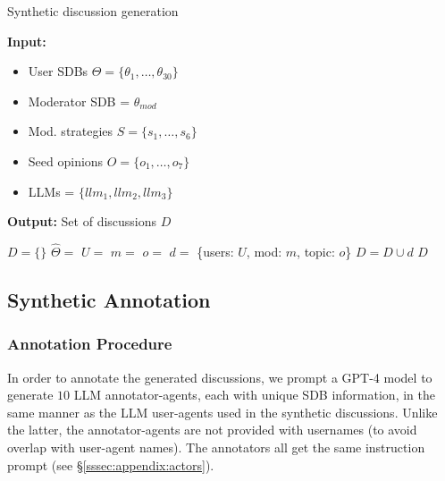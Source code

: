 \begin{algorithm}[t]
\caption{Synthetic discussion generation}
\label{alg:exp_generation}
\hspace*{\algorithmicindent} \textbf{Input:} 
         \begin{itemize}[noitemsep, nosep]
             \item User \acsp{SDB} $\Theta = \{\theta_1, \dots, \theta_{30}\}$
             \item Moderator \acs{SDB} = $\theta_{mod}$
             \item Mod. strategies $S = \{s_1, \ldots, s_6\}$
             \item Seed opinions $O = \{o_1, \ldots, o_7\}$
             \item \acp{LLM} = $\{llm_1, llm_2, llm_3\}$
         \end{itemize}
         \hspace*{\algorithmicindent} \textbf{Output:} Set of discussions $D$
\begin{algorithmic}[1]
    \State $D = \{\}$
                \State $\hat{\Theta} = $ 
                \State $U =$  
                \State $m = $ 
                \State $o = $ 
                \State $d =$ \{users: $U$, mod: $m$, topic: $o$\}
                \State $D = D \cup d$
            \EndFor
        \EndFor
    \EndFor
    \State \Return $D$
\end{algorithmic}
\end{algorithm}


\subsection{Synthetic Annotation}
\label{ssec:appendix:annotation}

\subsubsection{Annotation Procedure}

In order to annotate the generated discussions, we prompt a GPT-4 model \cite{openai2024gpt4technicalreport} to generate $10$ \ac{LLM} annotator-agents, each with unique \ac{SDB} information, in the same manner as the \ac{LLM} user-agents used in the synthetic discussions. Unlike the latter, the annotator-agents are not provided with usernames (to avoid overlap with user-agent names). The annotators all get the same instruction prompt (see \S\ref{sssec:appendix:actors}).

